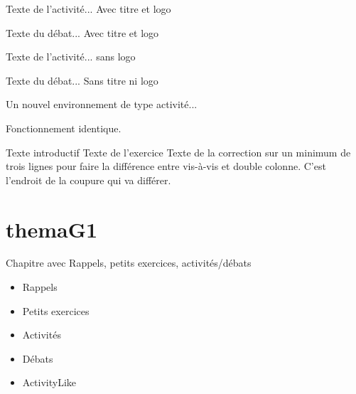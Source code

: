 \documentclass[nocrop]{sesamanuel}
\begin{document}
  \activites
  \begin{activite}
  Texte de l’activité... Avec titre et logo
  \end{activite}
  \begin{debat}
  Texte du débat... Avec titre et logo
  \end{debat}
  \begin{activite}
  Texte de l’activité... sans logo
  \end{activite}
  \begin{debat}
  Texte du débat... Sans titre ni logo
  \end{debat}
  \begin{nouveau}[titre][\tice]
  Un nouvel environnement de type activité...

  Fonctionnement identique.
  \end{nouveau}


  \cours  
  \begin{methode}
    Texte introductif
    \exercice
    Texte de l’exercice
    \correction
    Texte de la correction sur un minimum de trois lignes pour faire la
    différence entre vis-à-vis et double colonne. C’est l’endroit de la
    coupure qui va différer.
  \end{methode}


\themaG

\chapter{themaG1}
\begin{prerequis}[Prérequis - G1]
  Chapitre avec Rappels, petits exercices, activités/débats
  \begin{itemize}
  \item Rappels
  \item Petits exercices
  \item Activités
  \item Débats
  \item ActivityLike
  \end{itemize}
\end{prerequis}
\end{document}
